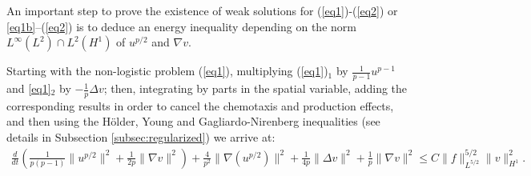 \documentclass[11pt,reqno]{amsart}%
\numberwithin{equation}{section}
\begin{document}
An important step to prove the existence of weak solutions  for  (\ref{eq1})-(\ref{eq2}) or \eqref{eq1b}--(\ref{eq2})  is to deduce an energy inequality depending on the norm $L^\infty(L^2)\cap L^2(H^1)$ of $u^{p/2}$ and $\nabla v$. 

Starting with the non-logistic problem (\ref{eq1}), 
multiplying (\ref{eq1})$_1$ by $\frac{1}{p-1}u^{p-1}$ and \eqref{eq1}$_2$ by $-\frac1p\Delta v$; then, integrating by parts in the spatial variable, adding the corresponding results in order to cancel the chemotaxis and production effects, and then using the H\"older, Young and Gagliardo-Nirenberg inequalities (see details in Subsection \ref{subsec:regularized}) we arrive at:
%
\begin{eqnarray} \label{B-20}
\frac{d}{dt}\!\left(\frac{1}{p(p-1)}\|u^{p/2}\|^2\!+\!\frac{1}{2p}\|\nabla v\|^2
\right)\!+\!\frac{4}{p^2}\|\nabla(u^{p/2})\|^2\!+\!\frac{1}{4p}\|\Delta v\|^2\!+\!\frac1p\|\nabla v\|^2\le\! {C\|f\|^{5/2}_{L^{5/2}}\|v\|^2_{H^1}.}
\end{eqnarray}
\end{document}
